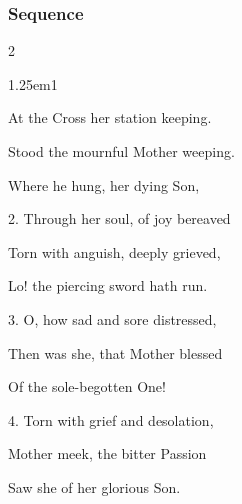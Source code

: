 
\subsubsection{Sequence}\label{dolorosa}

\vspace{-1\baselineskip}

\begin{multicols}{2}
\begin{hangparas}{1.25em}{1}
%
%

At the Cross her station keeping.

Stood the mournful Mother weeping.

Where he hung, her dying Son,\\

\vspace{-0.5\baselineskip}

2. Through her soul, of joy bereaved

Torn with anguish, deeply grieved,

Lo! the piercing sword hath run.\\

\vspace{-0.5\baselineskip}

3. O, how sad and sore distressed,

Then was she, that Mother blessed

Of the sole-begotten One!\\

\vspace{-0.5\baselineskip}

4. Torn with grief and desolation,

Mother meek, the bitter Passion

Saw she of her glorious Son.\\

\vspace{-0.5\baselineskip}


\end{hangparas}
\end{multicols}
